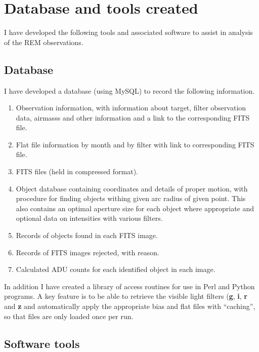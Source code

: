 \section{Database and tools created}
\protect\label{section:tools}

I have developed the following tools and associated software to assist in analysis of the REM observations.

\subsection{Database}
\protect\label{section:database}

I have developed a database (using MySQL) to record the following information.

\begin{enumerate}
\item Observation information, with information about target, filter observation data, airmasss and other information and a link to the corresponding FITS file.
\item Flat file information by month and by filter with link to corresponding FITS file.
\item FITS files (held in compressed format).
\item Object database containing coordinates and details of proper motion, with procedure for finding objects withing
  given arc radius of given point. This also contains an optimal aperture size for each object where appropriate and
  optional data on intensities with various filters.
\item Records of objects found in each FITS image.
\item Records of FITS images rejected, with reason.
\item Calculated ADU counts for each identified object in each image.
\end{enumerate}

In addition I have created a library of access routines for use in Perl and Python programs. A key feature is to be able
to retrieve the visible light filters (\textbf{g}, \textbf{i}, \textbf{r} and \textbf{z} and automatically apply the
appropriate bias and flat files with ``caching'', so that files are only loaded once per run.

\subsection{Software tools}
\protect\label{section:swtools}

